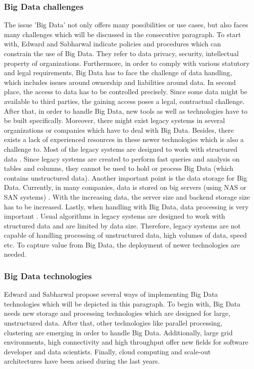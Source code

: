 \subsubsection{Big Data challenges}

The issue 'Big Data' not only offers many possibilities or use cases, but also faces many challenges \cite[p.11 ff.]{mongodb_edward} which will be discussed in the consecutive paragraph. To start with, Edward and Sabharwal indicate policies and procedures which can constrain the use of Big Data. They refer to data privacy, security, intellectual property of organizations. Furthermore, in order to comply with various statutory and legal requirements, Big Data has to face the challenge of data handling, which includes issues around ownership and liabilities around data. In second place, the access to data has to be controlled precisely. Since some data might be available to third parties, the gaining access poses a legal, contractual challenge. After that, in order to handle Big Data, new tools as well as technologies have to be built specifically. Moreover, there might exist legacy systems in several organizations or companies which have to deal with Big Data. Besides, there exists a lack of experienced resources in these newer technologies which is also a challenge to.
Most of the legacy systems are designed to work with structured data \cite[p.11 ff.]{mongodb_edward}. Since legacy systems are created to perform fast queries and analysis on tables and columns, they cannot be used to hold or process Big Data (which contains unstructured data). Another important point is the data storage for Big Data. Currently, in many companies, data is stored on big servers (using \ac{NAS} or \ac{SAN} systems) \cite[p.11 ff.]{mongodb_edward}. With the increasing data, the server size and backend storage size has to be increased. 
Lastly, when handling with Big Data, data processing is very important . Usual algorithms in legacy systems are designed to work with structured data and are limited by data size. Therefore, legacy systems are not capable of handling processing of unstructured data, high volumes of data, speed etc. To capture value from Big Data, the deployment of newer technologies are needed. 

\subsubsection{Big Data technologies}

Edward and Sabharwal propose several ways of implementing Big Data technologies \cite[p.12 ff.]{mongodb_edward} which will be depicted in this paragraph. To begin with, Big Data needs new storage and processing technologies which are designed for large, unstructured data. After that, other technologies like parallel processing, clustering are emerging in order to handle Big Data. Additionally, large grid environments, high connectivity and high throughput offer new fields for software developer and data scientists. Finally, cloud computing and scale-out architectures have been arised during the last years.

